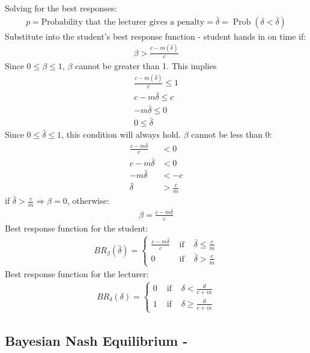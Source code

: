 \documentclass[11pt,preprint, authoryear]{elsarticle}
\numberwithin{equation}{section}
\numberwithin{figure}{section}
\numberwithin{table}{section}
\begin{document}
Solving for the best responses: \begin{align*}
p=\text{Probability that the lecturer gives a penalty} = \bar{\delta}=\operatorname{Prob}(\delta<\bar{\delta})
\end{align*} Substitute into the student's best response function -
student hands in on time if: \begin{align*}{}
\beta>\frac{c-m(\bar{\delta})}{c}
\end{align*}{} Since \(0 \leq \beta \leq 1\), \(\beta\) cannot be
greater than 1. This implies \begin{align*}{}
\frac{c-m(\bar{\delta})}{c} \leq 1 \\
c-m \bar{\delta} \leq c \\
-m \bar{\delta} \leq 0 \\
0 \leq \bar{\delta}
\end{align*}{} Since \(0 \leq \bar{\delta} \leq 1\), this condition will
always hold. \(\beta\) cannot be less than 0: \begin{align*}
\frac{c-m \bar{\delta}}{c}&<0 \\
c-m \bar{\delta}&<0 \\
-m \bar{\delta}&< -c \\
\bar{\delta}&>\frac{c}{m}
\end{align*} if \(\bar{\delta}>\frac{c}{m} \Rightarrow \beta=0\),
otherwise: \begin{align*}
\beta =\frac{c-m \bar{\delta}}{c}
\end{align*} Best response function for the student: \begin{align*}
B R_{\beta}(\bar{\delta})=\left\{\begin{array}{lll}
\frac{c-m\bar{\delta}}{c} & \text { if } & \bar{\delta}\leq \frac{c}{m} \\
0 & \text { if } & \bar{\delta}> \frac{c}{m}
\end{array}\right.
\end{align*} Best response function for the lecturer: \begin{align*}
B R_{\delta}(\delta)=\left\{\begin{array}{lll}
0 & \text { if } & \delta<\frac{d}{c+m} \\
1 & \text { if } & \delta \geq \frac{d}{c+m}
\end{array}\right.
\end{align*}

\hypertarget{bayesian-nash-equilibrium}{%
\subsection{\texorpdfstring{Bayesian Nash Equilibrium
\label{bay}{-}}{Bayesian Nash Equilibrium }}\label{bayesian-nash-equilibrium}}
\end{document}
